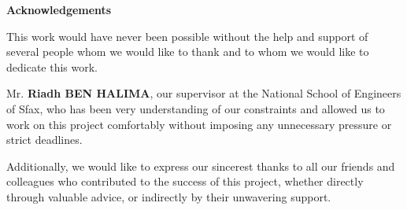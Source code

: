  \fancyhf{}
\renewcommand{\headrulewidth}{0pt}
\renewcommand{\footrulewidth}{0pt}

\vspace*{\fill}

\begin{center}
    \textbf{\huge{Acknowledgements}}
\end{center}
\vspace{1cm}

This work would have never been possible without the help and support of several people whom we would like to thank and to whom we would like to dedicate this work.\par
\vspace{0.5cm}

Mr. \textbf{Riadh BEN HALIMA}, our supervisor at the National School of Engineers of Sfax, who has been very understanding of our constraints and allowed us to work on this project comfortably without imposing any unnecessary pressure or strict deadlines. \par
\vspace{0.5cm}

Additionally, we would like to express our sincerest thanks to all our friends and colleagues who contributed to the success of this project, whether directly through valuable advice, or indirectly by their unwavering support.\par

\vspace{0.5cm}



\vspace*{\fill}

\newpage
\renewcommand{\headrulewidth}{1.5pt}
\renewcommand{\footrulewidth}{1.5pt}

\lhead{\textsl{\footnotesize{\nouppercase{\rightmark}}}}
\rhead{\textsl{\footnotesize{\nouppercase{\leftmark}}}}

\cfoot{\thepage}
\rfoot{\textsl{\footnotesize}}
